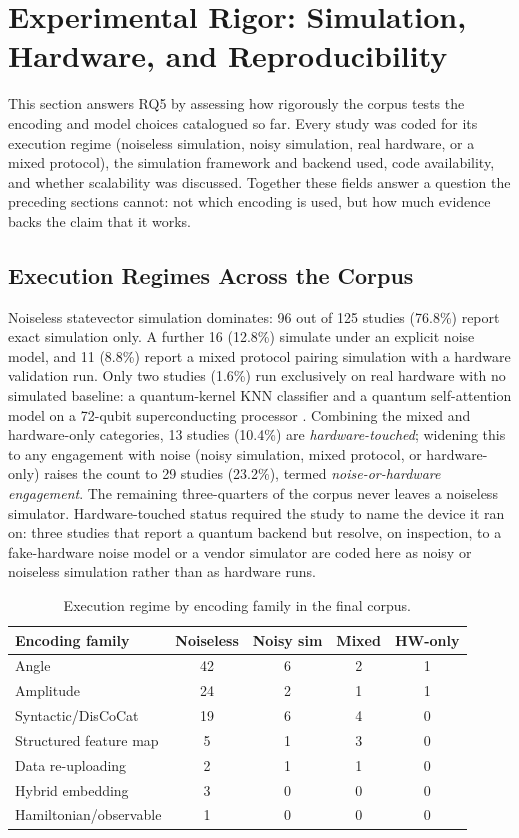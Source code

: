 \documentclass{ieeeaccess}
\begin{document}
\section{Experimental Rigor: Simulation, Hardware, and Reproducibility}
\label{sec:experimental_rigor}

This section answers RQ5 by assessing how rigorously the corpus tests the encoding and model choices catalogued so far. Every study was coded for its execution regime (noiseless simulation, noisy simulation, real hardware, or a mixed protocol), the simulation framework and backend used, code availability, and whether scalability was discussed. Together these fields answer a question the preceding sections cannot: not which encoding is used, but how much evidence backs the claim that it works.

\subsection{Execution Regimes Across the Corpus}
\label{subsec:execution_regimes}

Noiseless statevector simulation dominates: 96 out of 125 studies (76.8\%) report exact simulation only. A further 16 (12.8\%) simulate under an explicit noise model, and 11 (8.8\%) report a mixed protocol pairing simulation with a hardware validation run. Only two studies (1.6\%) run exclusively on real hardware with no simulated baseline: a quantum-kernel KNN classifier \cite{zeguendry_quantum_2024} and a quantum self-attention model on a 72-qubit superconducting processor \cite{he_training_2024}. Combining the mixed and hardware-only categories, 13 studies (10.4\%) are \emph{hardware-touched}; widening this to any engagement with noise (noisy simulation, mixed protocol, or hardware-only) raises the count to 29 studies (23.2\%), termed \emph{noise-or-hardware engagement}. The remaining three-quarters of the corpus never leaves a noiseless simulator. Hardware-touched status required the study to name the device it ran on: three studies that report a quantum backend but resolve, on inspection, to a fake-hardware noise model or a vendor simulator are coded here as noisy or noiseless simulation rather than as hardware runs.

\begin{table}[t]
\caption{Execution regime by encoding family in the final corpus.}
\label{tab:execution_by_encoding}
\centering
\scriptsize
\begin{tabular}{@{}lcccc@{}}
\hline
\textbf{Encoding family} & \textbf{Noiseless} & \textbf{Noisy sim} & \textbf{Mixed} & \textbf{HW-only}\\
\hline
Angle & 42 & 6 & 2 & 1\\
Amplitude & 24 & 2 & 1 & 1\\
Syntactic/DisCoCat & 19 & 6 & 4 & 0\\
Structured feature map & 5 & 1 & 3 & 0\\
Data re-uploading & 2 & 1 & 1 & 0\\
Hybrid embedding & 3 & 0 & 0 & 0\\
Hamiltonian/observable & 1 & 0 & 0 & 0\\
\hline
\end{tabular}
\end{table}
\end{document}
